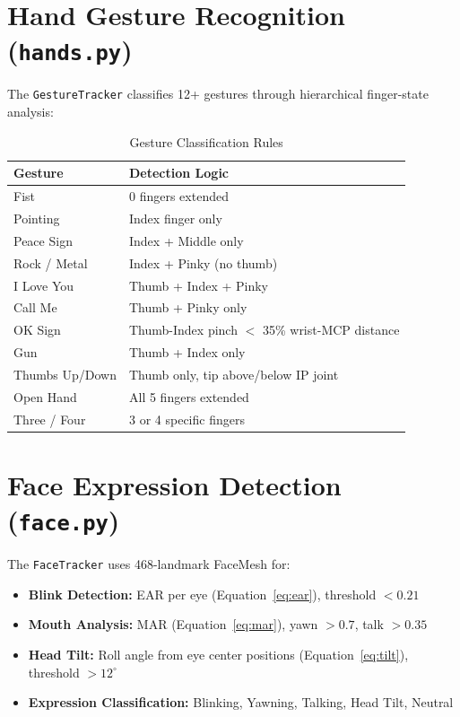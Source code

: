 \documentclass[a4paper,12pt]{report}
\begin{document}
\section{Hand Gesture Recognition (\texttt{hands.py})}
The \texttt{GestureTracker} classifies 12+ gestures through hierarchical finger-state analysis:

\begin{table}[H]
\centering
\small
\begin{tabular}{|l|l|}
\hline
\textbf{Gesture} & \textbf{Detection Logic} \\
\hline
Fist & 0 fingers extended \\
Pointing & Index finger only \\
Peace Sign & Index + Middle only \\
Rock / Metal & Index + Pinky (no thumb) \\
I Love You & Thumb + Index + Pinky \\
Call Me & Thumb + Pinky only \\
OK Sign & Thumb-Index pinch $<$ 35\% wrist-MCP distance \\
Gun & Thumb + Index only \\
Thumbs Up/Down & Thumb only, tip above/below IP joint \\
Open Hand & All 5 fingers extended \\
Three / Four & 3 or 4 specific fingers \\
\hline
\end{tabular}
\caption{Gesture Classification Rules}
\label{tab:gestures}
\end{table}

\section{Face Expression Detection (\texttt{face.py})}
The \texttt{FaceTracker} uses 468-landmark FaceMesh for:
\begin{itemize}
    \item \textbf{Blink Detection:} EAR per eye (Equation~\ref{eq:ear}), threshold $< 0.21$
    \item \textbf{Mouth Analysis:} MAR (Equation~\ref{eq:mar}), yawn $> 0.7$, talk $> 0.35$
    \item \textbf{Head Tilt:} Roll angle from eye center positions (Equation~\ref{eq:tilt}), threshold $> 12^{\circ}$
    \item \textbf{Expression Classification:} Blinking, Yawning, Talking, Head Tilt, Neutral
\end{itemize}
\end{document}
